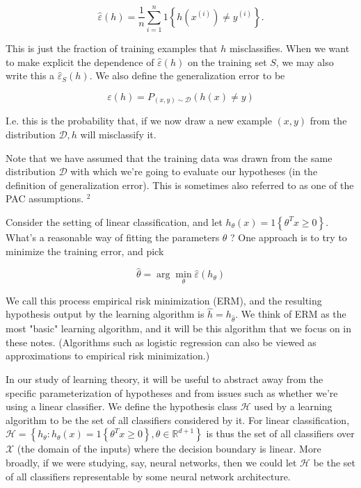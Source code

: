 \documentclass[10pt]{article}
\begin{document}
\[
\hat{\varepsilon}(h)=\frac{1}{n} \sum_{i=1}^{n} 1\left\{h\left(x^{(i)}\right) \neq y^{(i)}\right\} .
\]

This is just the fraction of training examples that \(h\) misclassifies. When we want to make explicit the dependence of \(\hat{\varepsilon}(h)\) on the training set \(S\), we may also write this a \(\hat{\varepsilon}_{S}(h)\). We also define the generalization error to be

\[
\varepsilon(h)=P_{(x, y) \sim \mathcal{D}}(h(x) \neq y)
\]

I.e. this is the probability that, if we now draw a new example \((x, y)\) from the distribution \(\mathcal{D}, h\) will misclassify it.

Note that we have assumed that the training data was drawn from the same distribution \(\mathcal{D}\) with which we're going to evaluate our hypotheses (in the definition of generalization error). This is sometimes also referred to as one of the PAC assumptions. \({ }^{2}\)

Consider the setting of linear classification, and let \(h_{\theta}(x)=1\left\{\theta^{T} x \geq 0\right\}\). What's a reasonable way of fitting the parameters \(\theta\) ? One approach is to try to minimize the training error, and pick

\[
\hat{\theta}=\arg \min _{\theta} \hat{\varepsilon}\left(h_{\theta}\right)
\]

We call this process empirical risk minimization (ERM), and the resulting hypothesis output by the learning algorithm is \(\hat{h}=h_{\hat{\theta}}\). We think of ERM as the most "basic" learning algorithm, and it will be this algorithm that we focus on in these notes. (Algorithms such as logistic regression can also be viewed as approximations to empirical risk minimization.)

In our study of learning theory, it will be useful to abstract away from the specific parameterization of hypotheses and from issues such as whether we're using a linear classifier. We define the hypothesis class \(\mathcal{H}\) used by a learning algorithm to be the set of all classifiers considered by it. For linear classification, \(\mathcal{H}=\left\{h_{\theta}: h_{\theta}(x)=1\left\{\theta^{T} x \geq 0\right\}, \theta \in \mathbb{R}^{d+1}\right\}\) is thus the set of all classifiers over \(\mathcal{X}\) (the domain of the inputs) where the decision boundary is linear. More broadly, if we were studying, say, neural networks, then we could let \(\mathcal{H}\) be the set of all classifiers representable by some neural network architecture.
\end{document}
